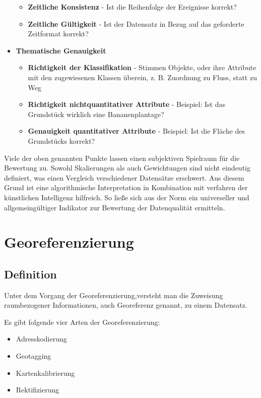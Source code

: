 \documentclass[11pt,fleqn]{book}
\begin{document}
\begin{itemize}
\begin{itemize}
\item \textbf{Zeitliche Konsistenz} - Ist die Reihenfolge der Ereignisse korrekt?
\item
\textbf{Zeitliche Gültigkeit} - Ist der Datensatz in Bezug auf das geforderte Zeitformat korrekt?
\end{itemize}
\item \textbf{Thematische Genauigkeit}
\begin{itemize}
\item
\textbf{Richtigkeit der Klassifikation} - Stimmen Objekte, oder ihre Attribute mit den zugewiesenen Klassen überein, z. B. Zuordnung zu Fluss, statt zu Weg
\item \textbf{Richtigkeit nichtquantitativer Attribute} - Beispiel: Ist das Grundstück wirklich eine Bananenplantage?
\item \textbf{Genauigkeit quantitativer Attribute} - Beispiel: Ist die Fläche des Grundstücks korrekt?
\end{itemize}
\end{itemize}

Viele der oben genannten Punkte lassen einen subjektiven Spielraum für die Bewertung zu. Sowohl Skalierungen als auch Gewichtungen sind nicht eindeutig definiert, was einen Vergleich verschiedener Datensätze erschwert. Aus diesem Grund ist eine algorithmische Interpretation in Kombination mit verfahren der künstlichen Intelligenz hilfreich. So ließe sich aus der Norm ein universeller und allgemeingültiger Indikator zur Bewertung der Datenqualität ermitteln.


\section{Georeferenzierung}
\subsection{Definition}
Unter dem Vorgang der Georeferenzierung,versteht man die Zuweisung raumbezogener Informationen, auch Georeferenz genannt, zu einem Datensatz.

Es gibt folgende vier Arten der Georeferenzierung:

\begin{itemize}
\item Adresskodierung
\item Geotagging 
\item Kartenkalibrierung 
\item Rektifizierung
\end{itemize}
\end{document}
